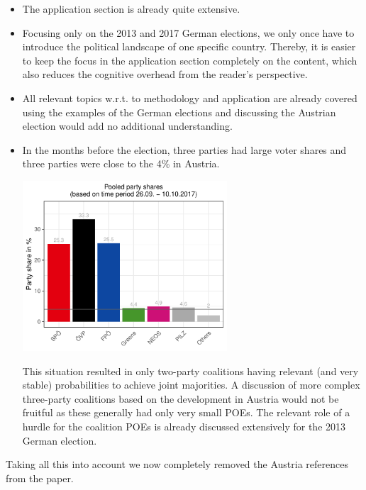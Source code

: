 \documentclass{scrartcl}
\begin{document}
\begin{enumerate}
\begin{itemize}
  \item The application section is already quite extensive.
  \item Focusing only on the 2013 and 2017 German elections, we only once have
  to introduce the political landscape of one specific country. Thereby, it is easier to keep the focus in the application section completely on the content,
  which also reduces the cognitive overhead from the reader's perspective.
  \item All relevant topics w.r.t. to methodology and application are already
  covered using the examples of the German elections and discussing the Austrian
  election would add no additional understanding.
  \item In the months before the election, three parties had large voter shares
  and three parties were close to the 4\% in Austria.
  \begin{center}
  \includegraphics[width=0.6\textwidth]{figures/austria}
  \end{center}
  This situation resulted in only two-party coalitions having relevant (and very stable) probabilities to achieve joint majorities. A discussion of more complex three-party coalitions based on the development in Austria would not be fruitful as these generally had only very small POEs.
  The relevant role of a hurdle for the coalition POEs is already discussed
  extensively for the 2013 German election.
\end{itemize}

Taking all this into account we now completely removed the Austria references from the paper.


\end{enumerate}
\end{document}

